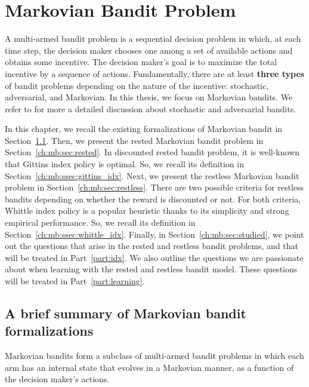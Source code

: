 \begingroup
\let\clearpage\relax

\chapter{Markovian Bandit Problem}
\label{ch:mb}

A multi-armed bandit problem is a sequential decision problem in which, at each time step, the decision maker chooses one among a set of available actions and obtains some incentive.
The decision maker's goal is to maximize the total incentive by a sequence of actions.
Fundamentally, there are at least \textbf{three types} of bandit problems depending on the nature of the incentive: stochastic, adversarial, and Markovian.
In this thesis, we focus on Markovian bandits.
We refer to \cite{bubeck2012regret} for more a detailed discussion about stochastic and adversarial bandits.

In this chapter, we recall the existing formalizations of Markovian bandit in Section~\ref{ch:mb:sec:summary}.
Then, we present the rested Markovian bandit problem in Section~\ref{ch:mb:sec:rested}.
In discounted rested bandit problem, it is well-known that Gittins index policy is optimal.
So, we recall its definition in Section~\ref{ch:mb:ssec:gittins_idx}.
Next, we present the restless Markovian bandit problem in Section~\ref{ch:mb:sec:restless}.
There are two possible criteria for restless bandits depending on whether the reward is discounted or not.
For both criteria, Whittle index policy is a popular heuristic thanks to its simplicity and strong empirical performance.
So, we recall its definition in Section~\ref{ch:mb:ssec:whittle_idx}.
Finally, in Section~\ref{ch:mb:sec:studied}, we point out the questions that arise in the rested and restless bandit problems, and that will be treated in Part~\ref{part:idx}.
We also outline the questions we are passionate about when learning with the rested and restless bandit model.
These questions will be treated in Part~\ref{part:learning}.

\section{A brief summary of Markovian bandit formalizations}
\label{ch:mb:sec:summary}

Markovian bandits form a subclass of multi-armed bandit problems in which each arm has an internal state that evolves in a Markovian manner, as a function of the decision maker’s actions.


